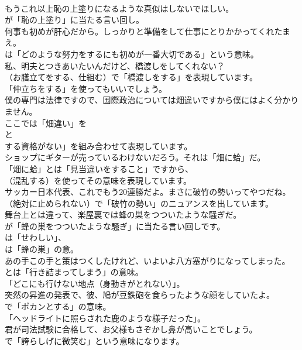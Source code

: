 \documentclass[8pt]{extreport}
\begin{document}
\begin{CJK}{UTF8}{min}
\\	もうこれ以上恥の上塗りになるような真似はしないでほしい。 
\\	が「恥の上塗り」に当たる言い回し。	
\\	何事も初めが肝心だから。しっかりと準備をして仕事にとりかかってくれたまえ。 
\\	は「どのような努力をするにも初めが一番大切である」という意味。	
\\	私、明夫とつきあいたいんだけど、橋渡しをしてくれない？ 
\\	（お膳立てをする、仕組む）で「橋渡しをする」を表現しています。 
\\	「仲立ちをする」を使ってもいいでしょう。	
\\	僕の専門は法律ですので、国際政治については畑違いですから僕にはよく分かりません。 
\\	ここでは「畑違い」を
\\	と
\\	する資格がない」を組み合わせて表現しています。	
\\	ショップにギターが売っているわけないだろう。それは「畑に蛤」だ。 
\\	「畑に蛤」とは「見当違いをすること」ですから、
\\	（混乱する）を使ってその意味を表現しています。	
\\	サッカー日本代表、これでもう20連勝だよ。まさに破竹の勢いってやつだね。 
\\	（絶対に止められない）で「破竹の勢い」のニュアンスを出しています。	
\\	舞台上とは違って、楽屋裏では蜂の巣をつついたような騒ぎだ。 
\\	が「蜂の巣をつついたような騒ぎ」に当たる言い回しです。
\\	は「せわしい」、
\\	は「蜂の巣」の意。	
\\	あの手この手と策はつくしたけれど、いよいよ八方塞がりになってしまった。 
\\	とは「行き詰まってしまう」の意味。
\\	「どこにも行けない地点（身動きがとれない）」。	
\\	突然の昇進の発表で、彼、鳩が豆鉄砲を食らったような顔をしていたよ。 
\\	で「ポカンとする」の意味。
\\	「ヘッドライトに照らされた鹿のような様子だった」。	
\\	君が司法試験に合格して、お父様もさぞかし鼻が高いことでしょう。 
\\	で「誇らしげに微笑む」という意味になります。	

\end{CJK}
\end{document}
